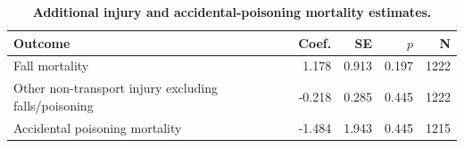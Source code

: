 \begin{table}[H]
\centering
\caption{\textbf{Additional injury and accidental-poisoning mortality estimates.}}
\label{tab:extra_negative_controls}
\begin{tabular}{lrrrr}
\toprule
Outcome & Coef. & SE & $p$ & N \\
\midrule
Fall mortality & 1.178 & 0.913 & 0.197 & 1222 \\
Other non-transport injury excluding falls/poisoning & -0.218 & 0.285 & 0.445 & 1222 \\
Accidental poisoning mortality & -1.484 & 1.943 & 0.445 & 1215 \\
\bottomrule
\end{tabular}
\end{table}
